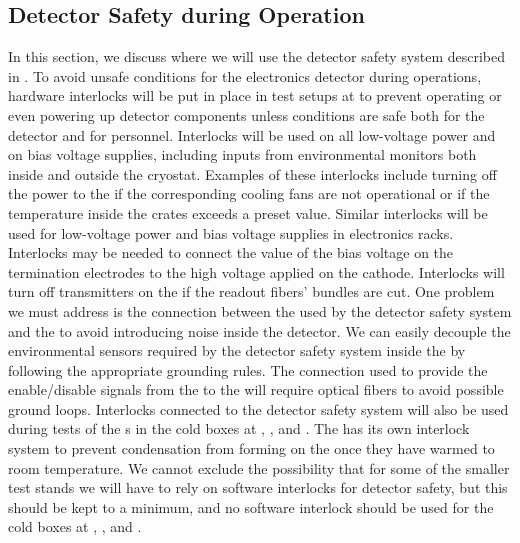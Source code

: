 \subsection{Detector Safety during Operation}
\label{sec:fdsp-tpcelec-safety-detops}

In this section, we discuss where we will use
the detector safety system described in \tcchesh.
To avoid unsafe conditions for the  electronics detector 
during operations, hardware interlocks will be put in place
in test setups at  to prevent operating or even powering up
detector components 
unless conditions are safe
both for the detector and for personnel. Interlocks will be
used on all low-voltage power and on bias voltage 
supplies, including inputs from environmental monitors both
inside and outside the cryostat. Examples of these interlocks include turning off the power to the 
if the corresponding cooling fans are not operational or
if the temperature inside the crates exceeds a preset value.
Similar interlocks will be used for low-voltage power
and bias voltage supplies in  electronics racks.
Interlocks may be needed to connect the value of the 
bias voltage on the  termination electrodes to the
high voltage applied on the  cathode. Interlocks will turn 
off transmitters on the  if the readout fibers'
bundles are cut. One problem we must address is 
the connection between the  used by the detector 
safety system and the  to avoid introducing noise 
inside the detector. We can easily decouple the environmental 
sensors required by the detector safety system inside the 
 by following the appropriate grounding rules. 
The connection used to provide the enable/disable signals 
from the  to the  will require optical 
fibers to avoid possible ground loops. Interlocks connected
to the detector safety system will also be used during tests 
of the s in the cold boxes at , ,
and . The  has its own interlock system to
prevent condensation from forming on the  once
they have warmed to room temperature. We cannot exclude the possibility that for some of the smaller test stands we will 
have to rely on software interlocks for detector safety,
but this should be kept to a minimum, and no software
interlock should be used for the cold boxes at
, ,
and .
